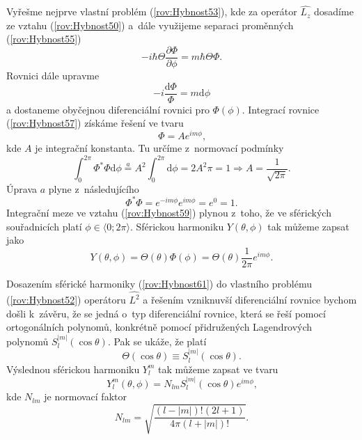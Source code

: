 Vyřešme nejprve vlastní problém (\ref{rov:Hybnost53}), kde za operátor $\hat{L_z}$ dosadíme ze vztahu (\ref{rov:Hybnost50}) a~dále využijeme separaci proměnných (\ref{rov:Hybnost55})
\begin{equation}
-i \hbar \Theta \frac{\partial \Phi}{\partial \phi} = m \hbar \Theta \Phi \mbox{.}
\label{rov:Hybnost56}
\end{equation}
Rovnici dále upravme
\begin{equation}
-i  \frac{\mathrm{d} \Phi}{\Phi} = m \mathrm{d} \phi
\label{rov:Hybnost57}
\end{equation}
a dostaneme obyčejnou diferenciální rovnici pro $\Phi(\phi)$. Integrací rovnice (\ref{rov:Hybnost57}) získáme řešení ve tvaru
\begin{equation}
\Phi = A e^{i m \phi} \mbox{,}
\label{rov:Hybnost58}
\end{equation}
kde $A$ je integrační konstanta. Tu určíme z~normovací podmínky
\begin{equation}
\int_{0}^{2\pi} \Phi^{\ast}\Phi \mathrm{d} \phi \stackrel{a}{=} A^2 \int_{0}^{2\pi} \mathrm{d} \phi = 2 A^2 \pi = 1 \Rightarrow A = \frac{1}{\sqrt{2 \pi}} \mbox{.}
\label{rov:Hybnost59}
\end{equation}
Úprava $a$ plyne z~následujícího
\begin{equation}
\Phi^{\ast}\Phi = e^{-i m \phi}e^{i m \phi}=e^0=1 \mbox{.}
\label{rov:Hybnost60}
\end{equation}
Integrační meze ve vztahu (\ref{rov:Hybnost59}) plynou z~toho, že ve sférických souřadnicích platí $\phi \in \langle 0;2\pi\rangle$. Sférickou harmoniku $Y(\theta, \phi)$ tak můžeme zapsat jako
\begin{equation}
Y(\theta, \phi) = \Theta(\theta) \Phi(\phi) = \Theta(\theta) \frac{1}{2\pi}e^{im\phi} \mbox{.}
\label{rov:Hybnost61}
\end{equation}

Dosazením sférické harmoniky (\ref{rov:Hybnost61}) do vlastního problému (\ref{rov:Hybnost52}) operátoru $\hat{L^2}$ a řešením vzniknuvší diferenciální rovnice bychom došli k~závěru, že se jedná o~typ diferenciální rovnice, která se řeší pomocí ortogonálních polynomů, konkrétně pomocí přidružených Lagendrových polynomů $S_l^{|m|}(\cos \theta)$. Pak se ukáže, že platí
\begin{equation}
\Theta(\cos \theta) \equiv S_l^{|m|} (\cos \theta) \mbox{.}
\label{rov:Hybnost62}
\end{equation}
Výslednou sférickou harmoniku $Y_l^{m}$ tak můžeme zapsat ve tvaru
\begin{equation}
\boxed{Y_l^{m}(\theta, \phi) = N_{lm} S_l^{|m|} (\cos \theta) e^{i m \phi} \mbox{,}}
\label{rov:Hybnost63}
\end{equation}
kde $N_{lm}$ je normovací faktor
\begin{equation}
N_{lm} = \sqrt{\frac{(l-|m|)! (2l+1)}{4\pi(l+|m|)!}}\mbox{.}
\label{rov:Hybnost64}
\end{equation}

